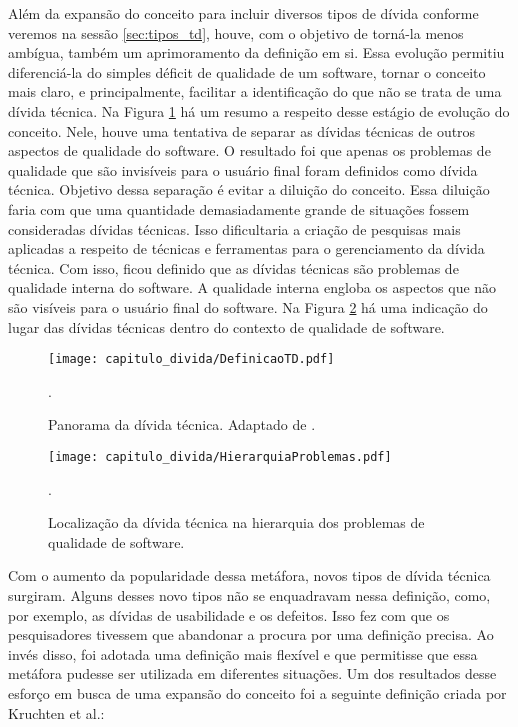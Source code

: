 Além da expansão do conceito para incluir diversos tipos de dívida conforme veremos na sessão \ref{sec:tipos_td}, houve, com o objetivo de torná-la menos ambígua, também um aprimoramento da definição em si. Essa evolução permitiu diferenciá-la do simples déficit de qualidade de um software, tornar o conceito mais claro, e principalmente, facilitar a identificação do que não se trata de uma dívida técnica. Na Figura \ref{fig:cap1_panorama_td} há um resumo a respeito desse estágio de evolução do conceito. Nele, houve uma tentativa de separar as dívidas técnicas de outros aspectos de qualidade do software. O resultado foi que apenas os problemas de qualidade que são invisíveis para o usuário final foram definidos como dívida técnica. Objetivo dessa separação é evitar a diluição do conceito. Essa diluição faria com que uma quantidade demasiadamente grande de situações fossem consideradas dívidas técnicas. Isso dificultaria a criação de pesquisas mais aplicadas a respeito de técnicas e ferramentas para o gerenciamento da dívida técnica. Com isso, ficou definido que as dívidas técnicas são problemas de qualidade interna do software. A qualidade interna engloba os aspectos que não são visíveis para o usuário final do software\cite{al2010quality}. Na Figura \ref{fig:cap1_hierarquia_qualidade} há uma indicação do lugar das dívidas técnicas dentro do contexto de qualidade de software.


 \begin{figure}[H]
  \centering
  \texttt{[image: capitulo\_divida/DefinicaoTD.pdf]} 
  \caption{Panorama da dívida técnica. Adaptado de \cite{kruchten2013technical}. }.
  \label{fig:cap1_panorama_td} 
\end{figure}

 \begin{figure}[H]
  \centering
  \texttt{[image: capitulo\_divida/HierarquiaProblemas.pdf]} 
  \caption{Localização da dívida técnica na hierarquia dos problemas de qualidade de software. }.
  \label{fig:cap1_hierarquia_qualidade} 
\end{figure}


Com o aumento da popularidade dessa metáfora, novos tipos de dívida técnica surgiram. Alguns desses novo tipos não se enquadravam nessa definição, como, por exemplo, as dívidas de usabilidade e os defeitos. Isso fez com que os pesquisadores tivessem que abandonar a procura por uma definição precisa. Ao invés disso, foi adotada uma definição mais flexível e que permitisse que essa metáfora pudesse ser utilizada em diferentes situações. Um dos resultados desse esforço em busca de uma expansão do conceito foi a seguinte definição criada por Kruchten et al.\cite{kruchten2013technical}:

